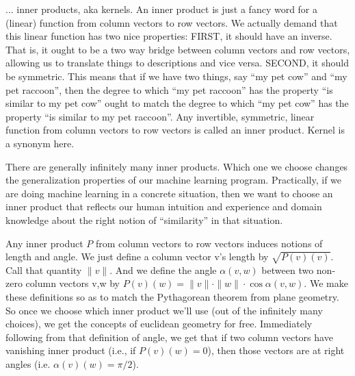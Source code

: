 \documentclass[11pt, justified]{tufte-book}
\theoremstyle{definition}
\begin{document}
        ... inner products, aka kernels.  An inner product is just a fancy word
        for a (linear) function from column vectors to row vectors.  We
        actually demand that this linear function has two nice properties:
        FIRST, it should have an inverse.  That is, it ought to be a two way
        bridge between column vectors and row vectors, allowing us to translate
        things to descriptions and vice versa.  SECOND, it should be symmetric.
        This means that if we have two things, say ``my pet cow'' and ``my pet
        raccoon'', then the degree to which ``my pet raccoon'' has the property
        ``is similar to my pet cow'' ought to match the degree to which ``my pet
        cow'' has the property ``is similar to my pet raccoon''.  Any invertible,
        symmetric, linear function from column vectors to row vectors is called
        an inner product.  Kernel is a synonym here.

        There are generally infinitely many inner products.  Which one we
        choose changes the generalization properties of our machine learning
        program.  Practically, if we are doing machine learning in a concrete
        situation, then we want to choose an inner product that reflects our
        human intuition and experience and domain knowledge about the right
        notion of ``similarity'' in that situation.
        
        Any inner product $P$ from column vectors to row vectors induces notions
        of length and angle.  We just define a column vector v's length by
        $\sqrt{P(v)(v)}$.  Call that quantity $\|v\|$.  And we define the angle
        $\alpha(v,w)$ between two non-zero column vectors v,w by
        $P(v)(w)=\|v\|\cdot\|w\|\cdot\cos\alpha(v,w)$.  We make these
        definitions so as to match the Pythagorean theorem from plane geometry.
        So once we choose which inner product we'll use (out of the infinitely
        many choices), we get the concepts of euclidean geometry for free.
        Immediately following from that definition of angle, we get that if two
        column vectors have vanishing inner product (i.e., if $P(v)(w)=0$), then
        those vectors are at right angles (i.e. $\alpha(v)(w)=\pi/2$).
        
\end{document}
